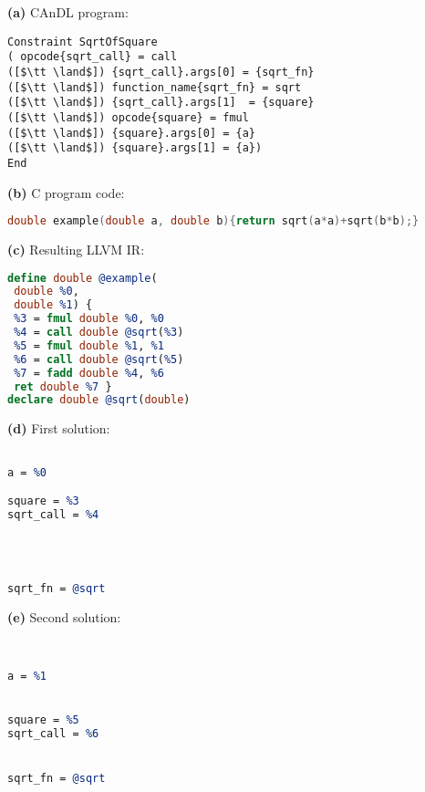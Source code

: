 \centering
\begin{minipage}[t]{0.67\textwidth}
\centering
{\bf(a)} CAnDL program:
\begin{lstlisting}[language=CAnDL]
Constraint SqrtOfSquare
( opcode{sqrt_call} = call
([$\tt \land$]) {sqrt_call}.args[0] = {sqrt_fn}
([$\tt \land$]) function_name{sqrt_fn} = sqrt
([$\tt \land$]) {sqrt_call}.args[1]  = {square}
([$\tt \land$]) opcode{square} = fmul
([$\tt \land$]) {square}.args[0] = {a}
([$\tt \land$]) {square}.args[1] = {a})
End
\end{lstlisting}
\end{minipage}

\vspace{1em}
\begin{minipage}[t]{\textwidth}
\centering
{\bf(b)} C program code:
\begin{lstlisting}[numbers=none,framexleftmargin=0pt,xleftmargin=0pt,language=C]
double example(double a, double b){return sqrt(a*a)+sqrt(b*b);}
\end{lstlisting}
\begin{minipage}[t]{7.0cm}
\centering
{\bf(c)} Resulting LLVM IR:
\begin{lstlisting}[language={LLVM}]
define double @example(    
 double %0,                
 double %1) {              
 %3 = fmul double %0, %0   
 %4 = call double @sqrt(%3)
 %5 = fmul double %1, %1   
 %6 = call double @sqrt(%5)
 %7 = fadd double %4, %6   
 ret double %7 }
declare double @sqrt(double)      
\end{lstlisting}
\end{minipage}
\hfill
\begin{minipage}[t]{3.5cm}
\centering
{\bf(d)} First solution:
\begin{lstlisting}[numbers=none,framexleftmargin=0pt,xleftmargin=0pt,language=LLVM]

a = %0

square = %3
sqrt_call = %4 




sqrt_fn = @sqrt
\end{lstlisting}
\end{minipage}
\hfill
\begin{minipage}[t]{3.5cm}
\centering
{\bf(e)} Second solution:
\begin{lstlisting}[numbers=none,framexleftmargin=0pt,xleftmargin=0pt,language=LLVM]


a = %1


square = %5
sqrt_call = %6


sqrt_fn = @sqrt
\end{lstlisting}
\end{minipage}
\end{minipage}


